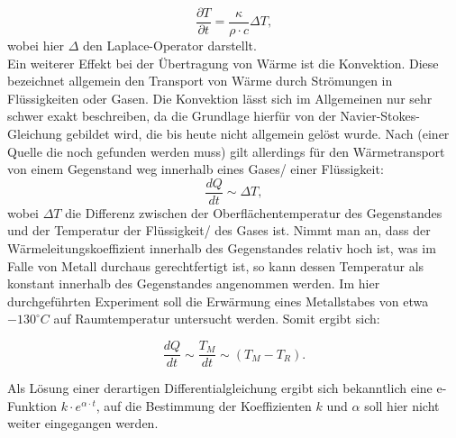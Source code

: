 \begin{equation}
\frac{\partial T}{\partial t} = \frac{\kappa}{\rho \cdot c} \Delta T, 
\end{equation}
wobei hier $\Delta$ den Laplace-Operator darstellt. 
\\
Ein weiterer Effekt bei der Übertragung von Wärme ist die Konvektion. Diese bezeichnet allgemein den Transport von Wärme durch Strömungen in Flüssigkeiten oder Gasen. Die Konvektion lässt sich im Allgemeinen nur sehr schwer exakt beschreiben, da die Grundlage hierfür von der Navier-Stokes-Gleichung gebildet wird, die bis heute nicht allgemein gelöst wurde. Nach (einer Quelle die noch gefunden werden muss) gilt allerdings für den Wärmetransport von einem Gegenstand weg innerhalb eines Gases/ einer Flüssigkeit: 
\begin{equation}
\frac{dQ}{dt} \sim \Delta T,
\end{equation}
wobei $\Delta T$ die Differenz zwischen der Oberflächentemperatur des Gegenstandes und der Temperatur der Flüssigkeit/ des Gases ist. 
Nimmt man an, dass der Wärmeleitungskoeffizient innerhalb des Gegenstandes relativ hoch ist, was im Falle von Metall durchaus gerechtfertigt ist, so kann dessen Temperatur als konstant innerhalb des Gegenstandes angenommen werden. 
Im hier durchgeführten Experiment soll die Erwärmung eines Metallstabes von etwa $ -130 ^{\circ} C $ auf Raumtemperatur untersucht werden. Somit ergibt sich: 

\begin{equation}
\frac{dQ}{dt} \sim  \frac{T_M}{dt} \sim (T_{M} - T_{R}). 
\end{equation}

Als Lösung einer derartigen Differentialgleichung ergibt sich bekanntlich eine e-Funktion $k \cdot e^{\alpha \cdot t}$, auf die Bestimmung der Koeffizienten $k$ und $\alpha$ soll hier nicht weiter eingegangen werden. 
